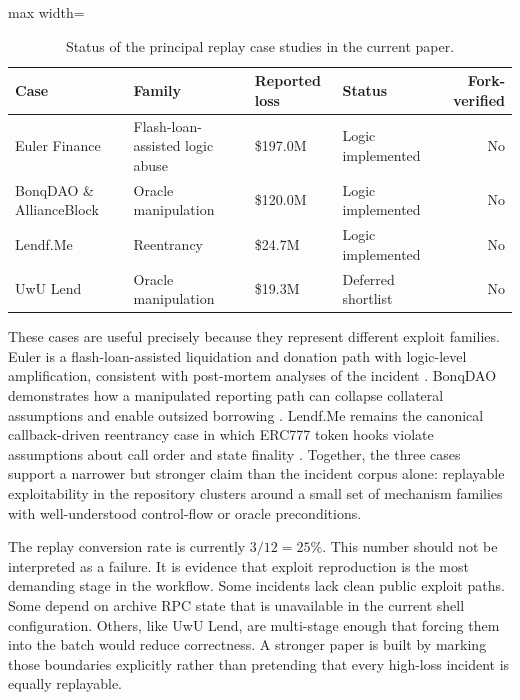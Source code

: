 \begin{table}[t]
\centering
\caption{Status of the principal replay case studies in the current paper.}
\label{tab:replay-cases}
\begin{adjustbox}{max width=\textwidth}
\begin{tabular}{llllr}
\toprule
\textbf{Case} & \textbf{Family} & \textbf{Reported loss} & \textbf{Status} & \textbf{Fork-verified} \\
\midrule
Euler Finance & Flash-loan-assisted logic abuse & \$197.0M & Logic implemented & No \\
BonqDAO \& AllianceBlock & Oracle manipulation & \$120.0M & Logic implemented & No \\
Lendf.Me & Reentrancy & \$24.7M & Logic implemented & No \\
UwU Lend & Oracle manipulation & \$19.3M & Deferred shortlist & No \\
\bottomrule
\end{tabular}
\end{adjustbox}
\end{table}

These cases are useful precisely because they represent different exploit families. Euler is a flash-loan-assisted liquidation and donation path with logic-level amplification, consistent with post-mortem analyses of the incident \citep{eulerPostmortem}. BonqDAO demonstrates how a manipulated reporting path can collapse collateral assumptions and enable outsized borrowing \citep{bonqIncident}. Lendf.Me remains the canonical callback-driven reentrancy case in which ERC777 token hooks violate assumptions about call order and state finality \citep{lendfmeIncident}. Together, the three cases support a narrower but stronger claim than the incident corpus alone: replayable exploitability in the repository clusters around a small set of mechanism families with well-understood control-flow or oracle preconditions.

The replay conversion rate is currently $3/12 = 25\%$. This number should not be interpreted as a failure. It is evidence that exploit reproduction is the most demanding stage in the workflow. Some incidents lack clean public exploit paths. Some depend on archive RPC state that is unavailable in the current shell configuration. Others, like UwU Lend, are multi-stage enough that forcing them into the batch would reduce correctness. A stronger paper is built by marking those boundaries explicitly rather than pretending that every high-loss incident is equally replayable.
